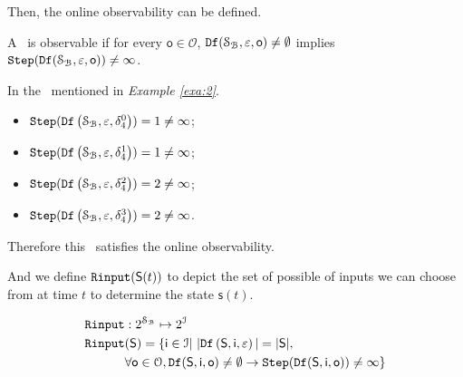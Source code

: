 

Then, the online observability can be defined.
\begin{definition}
 A \BCN\ is observable
if for every $\mathsf{o}\in  \mathcal{O}$, ${\tt Df}(\mathcal{S}_{\mathcal{B}},\varepsilon, \mathsf{o})\ne\emptyset$ implies ${\tt Step}({\tt Df}(\mathcal{S}_{\mathcal{B}},\varepsilon,\mathsf{o}))\ne\infty$.
\end{definition}


\begin{example}
In the \BCN\ mentioned in {\em Example \ref{exa:2}}.  
 \begin{itemize}
 \item ${\tt Step}({\tt Df}\left(\mathcal{S}_{\mathcal{B}},\varepsilon, \delta_{4}^0\right))=1\ne \infty$;
 \item ${\tt Step}({\tt Df}\left(\mathcal{S}_{\mathcal{B}},\varepsilon, \delta_{4}^1\right))=1\ne \infty$;
 \item ${\tt Step}({\tt Df}\left(\mathcal{S}_{\mathcal{B}},\varepsilon, \delta_{4}^2\right))=2\ne \infty$;
 \item ${\tt Step}({\tt Df}\left(\mathcal{S}_{\mathcal{B}},\varepsilon, \delta_{4}^3\right))=2\ne \infty$.
 \end{itemize}
Therefore this \BCN\ satisfies the online observability.%
\label{exa:10}
\end{example}  

And we define ${\tt Rinput}(\mathsf{S}(t))$ to depict the set of possible of inputs we can choose from at time $t$ to determine the state $\mathsf{s}(t)$.

\begin{equation}
\begin{split}
{\tt Rinput}&:2^{\mathcal{S}_{\mathcal{B}}} \mapsto2^{\mathcal{I}}\\
{\tt Rinput}&(\mathsf{S})=\{\mathsf{i}\in \mathcal{I}|\  |{\tt Df}\left(\mathsf{S},\mathsf{i},\varepsilon\right)|=|\mathsf{S}|, \\
&\forall \mathsf{o} \in \mathcal{O}, {\tt Df}(\mathsf{S},\mathsf{i},\mathsf{o})\ne \emptyset \rightarrow {\tt Step}({\tt Df}(\mathsf{S},\mathsf{i},\mathsf{o}))\ne \infty\}
\end{split}
\end{equation}

